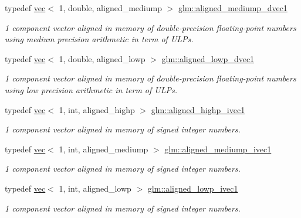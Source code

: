 \begin{DoxyCompactItemize}
typedef \mbox{\hyperlink{structglm_1_1vec}{vec}}$<$ 1, double, aligned\+\_\+mediump $>$ \mbox{\hyperlink{group__gtc__type__aligned_gad123cfb2803e67ae9f973bbd57bf86e3}{glm\+::aligned\+\_\+mediump\+\_\+dvec1}}
\begin{DoxyCompactList}\small\item\em 1 component vector aligned in memory of double-\/precision floating-\/point numbers using medium precision arithmetic in term of U\+L\+Ps. \end{DoxyCompactList}\item 
typedef \mbox{\hyperlink{structglm_1_1vec}{vec}}$<$ 1, double, aligned\+\_\+lowp $>$ \mbox{\hyperlink{group__gtc__type__aligned_gaa0811727b30ac5c917d48f43354f2d1f}{glm\+::aligned\+\_\+lowp\+\_\+dvec1}}
\begin{DoxyCompactList}\small\item\em 1 component vector aligned in memory of double-\/precision floating-\/point numbers using low precision arithmetic in term of U\+L\+Ps. \end{DoxyCompactList}\item 
typedef \mbox{\hyperlink{structglm_1_1vec}{vec}}$<$ 1, int, aligned\+\_\+highp $>$ \mbox{\hyperlink{group__gtc__type__aligned_ga90ebad7148156f223d4743091c9870d5}{glm\+::aligned\+\_\+highp\+\_\+ivec1}}
\begin{DoxyCompactList}\small\item\em 1 component vector aligned in memory of signed integer numbers. \end{DoxyCompactList}\item 
typedef \mbox{\hyperlink{structglm_1_1vec}{vec}}$<$ 1, int, aligned\+\_\+mediump $>$ \mbox{\hyperlink{group__gtc__type__aligned_ga03b5b767207f413195dde0290a19dac1}{glm\+::aligned\+\_\+mediump\+\_\+ivec1}}
\begin{DoxyCompactList}\small\item\em 1 component vector aligned in memory of signed integer numbers. \end{DoxyCompactList}\item 
typedef \mbox{\hyperlink{structglm_1_1vec}{vec}}$<$ 1, int, aligned\+\_\+lowp $>$ \mbox{\hyperlink{group__gtc__type__aligned_gadf9e665b78c3aead513e9505fa31f9e2}{glm\+::aligned\+\_\+lowp\+\_\+ivec1}}
\begin{DoxyCompactList}\small\item\em 1 component vector aligned in memory of signed integer numbers. \end{DoxyCompactList}\item 

\end{DoxyCompactItemize}
